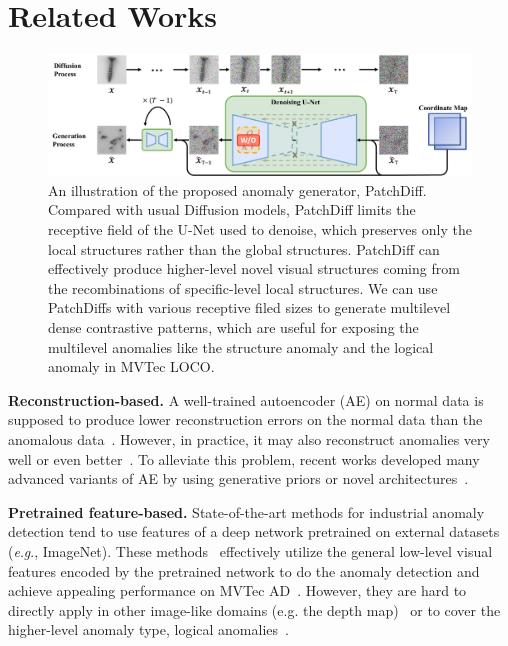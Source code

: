\documentclass[letterpaper]{article} %
\newcommand{\eg}{\textit{e}.\textit{g}.}
\begin{document}
\section{Related Works}


\begin{figure}[!t]
\centering
\includegraphics[width=\linewidth]{images/diffusion.pdf}
    \caption{An illustration of the proposed anomaly generator, PatchDiff. Compared with usual Diffusion models, PatchDiff limits the receptive field of the U-Net used to denoise, which preserves only the local structures rather than the global structures. PatchDiff can effectively produce higher-level novel visual structures coming from the recombinations of specific-level local structures. We can use PatchDiffs with various receptive filed sizes to generate multilevel dense contrastive patterns, which are useful for exposing the multilevel anomalies like the structure anomaly and the logical anomaly in MVTec LOCO.}
    \label{fig: PatchDiff}
\end{figure}

\noindent\textbf{Reconstruction-based.}
A well-trained autoencoder (AE) on normal data is supposed to produce lower reconstruction errors on the normal data than the anomalous data~\cite{AE1, AE2, VAE}. However, in practice, it may also reconstruct anomalies very well or even better~\cite{Pidhorskyi2018GenerativePN}. To alleviate this problem, recent works developed many advanced variants of AE by using generative priors or novel architectures~\cite{OCGAN, MemAE, DAAD, RIAD, InTra, SSPCAB, UniAD}.

\noindent\textbf{Pretrained feature-based.}
State-of-the-art methods for industrial anomaly detection tend to use features of a deep network pretrained on external datasets (\eg, ImageNet). These methods~\cite{PaDiM, DifferNet, Cflow-ad, PatchCore, hyun2023reconpatch, zhang2023prototypical} effectively utilize the general low-level visual features encoded by the pretrained network to do the anomaly detection and achieve appealing performance on MVTec AD~\cite{MVTecAD}. However, they are hard to directly apply in other image-like domains (e.g. the depth map)~\cite{mvtec3D, BackTo3dFeatures} or to cover the higher-level anomaly type, logical anomalies~\cite{MVloco}.
\end{document}

